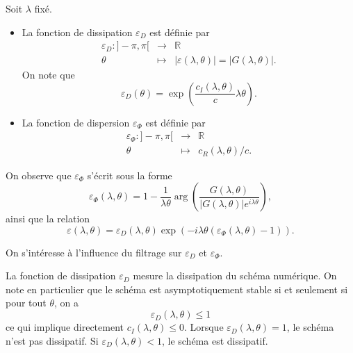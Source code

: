\begin{definition}
Soit $\lambda$ fixé.
\begin{itemize}
\item La fonction de dissipation $\varepsilon_D$ est définie par
\begin{equation}
\begin{array}{rcl}
\varepsilon_D : ]- \pi, \pi[ & \rightarrow & \mathbb{R} \\
\theta & \mapsto & |\varepsilon(\lambda,\theta)| = |G(\lambda, \theta)|.
\end{array}
\end{equation}
On note que 
\begin{equation}
\varepsilon_D(\theta) = \exp \left( \dfrac{c_I(\lambda, \theta)}{c} \lambda \theta \right).
\end{equation}

\item La fonction de dispersion $\varepsilon_{\Phi}$ est définie par
\begin{equation}
\begin{array}{rcl}
\varepsilon_{\Phi} : ]- \pi, \pi[ & \rightarrow & \mathbb{R} \\
\theta & \mapsto & c_R(\lambda, \theta)/c.
\end{array}
\end{equation}
\end{itemize}
\end{definition}


\begin{remarque}
On observe que $\varepsilon_{\Phi}$ s'écrit sous la forme
\begin{equation}
\varepsilon_{\Phi}(\lambda, \theta) = 1 - \dfrac{1}{\lambda \theta} \arg \left( \dfrac{G(\lambda, \theta)}{|G(\lambda,\theta)| e^{i \lambda \theta}} \right),
\end{equation}
ainsi que la relation
\begin{equation}
\varepsilon(\lambda,\theta) = \varepsilon_D(\lambda,\theta) \exp \left( - i \lambda \theta \left( \varepsilon_{\Phi}(\lambda,\theta) -1 \right) \right).
\end{equation}
\end{remarque}

On s’intéresse à l'influence du filtrage sur $\varepsilon_D$ et $\varepsilon_{\Phi}$. 

La fonction de dissipation $\varepsilon_D$ mesure la dissipation du schéma numérique. On note en particulier que le schéma est asymptotiquement stable si et seulement si pour tout $\theta$, on a 
\begin{equation}
\varepsilon_D(\lambda,\theta) \leq 1
\end{equation}
ce qui implique directement $c_I(\lambda,\theta) \leq 0$. Lorsque $\varepsilon_D(\lambda, \theta) = 1$, le schéma n'est pas dissipatif. Si $\varepsilon_D(\lambda,\theta) < 1$, le schéma est dissipatif.

